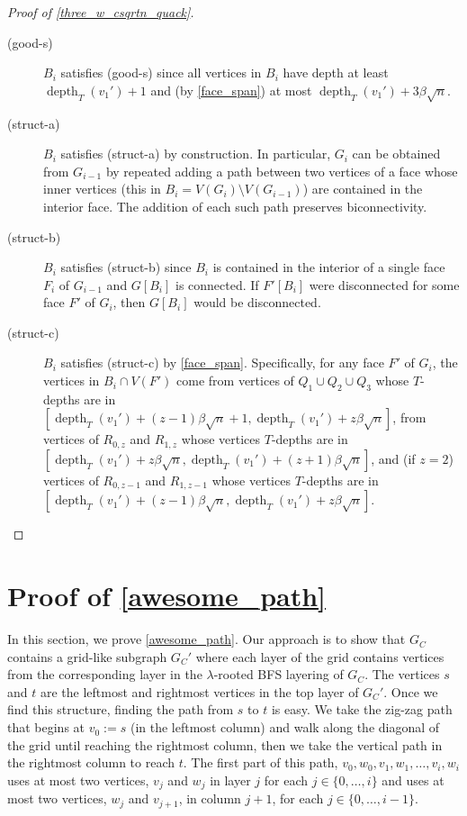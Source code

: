 \documentclass{patmorin}
\DeclareMathOperator{\depth}{depth}
\begin{document}
\begin{proof}[Proof of \cref{three_w_csqrtn_quack}]
\begin{description}
    \item[(good-s)] $B_i$ satisfies (good-s) since all vertices in $B_i$ have depth at least $\depth_T(v_1')+1$ and (by \cref{face_span}) at most $\depth_T(v_1')+3\beta\sqrt{n}$.

    \item[(struct-a)] $B_i$ satisfies (struct-a) by construction.  In particular, $G_i$ can be obtained from $G_{i-1}$ by repeated adding a path between two vertices of a face whose inner vertices (this in $B_i=V(G_i)\setminus V(G_{i-1})$) are contained in the interior face.  The addition of each such path preserves biconnectivity.

    \item[(struct-b)] $B_i$ satisfies (struct-b) since $B_i$ is contained in the interior of a single face $F_i$ of $G_{i-1}$ and $G[B_i]$ is connected.  If $F'[B_i]$ were disconnected for some face $F'$ of $G_i$, then $G[B_i]$ would be disconnected.

    \item[(struct-c)] $B_i$ satisfies (struct-c) by \cref{face_span}.  Specifically, for any face $F'$ of $G_i$, the vertices in $B_i\cap V(F')$ come from vertices of $Q_1\cup Q_2\cup Q_3$ whose $T$-depths are in $[\depth_T(v_1')+(z-1)\beta\sqrt{n}+1,\depth_T(v_1')+z\beta\sqrt{n}]$, from vertices of $R_{0,z}$ and $R_{1,z}$ whose vertices $T$-depths are in $[\depth_T(v_1')+z\beta\sqrt{n},\depth_T(v_1')+(z+1)\beta\sqrt{n}]$, and (if $z=2$) vertices of $R_{0,z-1}$ and $R_{1,z-1}$ whose vertices $T$-depths are in $[\depth_T(v_1')+(z-1)\beta\sqrt{n},\depth_T(v_1')+z\beta\sqrt{n}]$. \qedhere
  \end{description}
\end{proof}



\section{Proof of \cref{awesome_path}}
\label{crux_section}

In this section, we prove \cref{awesome_path}.  Our approach is to show that $G_C$ contains a grid-like subgraph $G_C'$ where each layer of the grid contains vertices from the corresponding layer in the $\lambda$-rooted BFS layering of $G_C$. The vertices $s$ and $t$ are the leftmost and rightmost vertices in the top layer of $G_C'$.  Once we find this structure, finding the path from $s$ to $t$ is easy.  We take the zig-zag path that begins at $v_0:=s$ (in the leftmost column) and walk along the diagonal of the grid until reaching the rightmost column, then we take the vertical path in the rightmost column to reach $t$. The first part of this path, $v_0,w_0,v_1,w_1,\ldots,v_i,w_i$ uses at most two vertices, $v_j$ and $w_j$ in layer $j$ for each $j\in\{0,\ldots,i\}$ and uses at most two vertices, $w_j$ and $v_{j+1}$, in column $j+1$, for each $j\in\{0,\ldots,i-1\}$.
\end{document}
